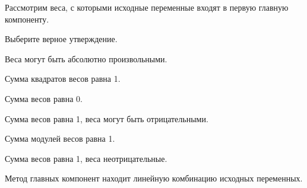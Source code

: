 
\begin{question}
Рассмотрим веса, с которыми исходные переменные входят в первую главную компоненту.

Выберите верное утверждение.
\begin{answerlist}
  \item Веса могут быть абсолютно произвольными.
  \item Сумма квадратов весов равна 1.
  \item Сумма весов равна 0.
  \item Сумма весов равна 1, веса могут быть отрицательными.
  \item Сумма модулей весов равна 1.
  \item Сумма весов равна 1, веса неотрицательные.
\end{answerlist}
\end{question}

\begin{solution}
Метод главных компонент находит линейную комбинацию исходных переменных.
\end{solution}

